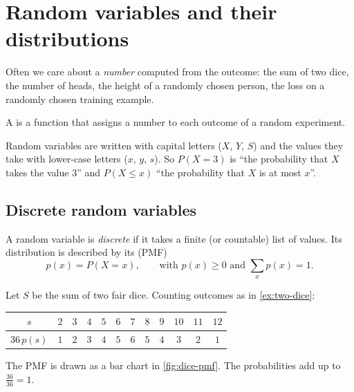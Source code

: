 \section{Random variables and their distributions}\label{sec:random-variables}

Often we care about a \emph{number} computed from the outcome: the sum of two
dice, the number of heads, the height of a randomly chosen person, the loss on a
randomly chosen training example.

\begin{definition}\label{def:random-variable}
A  is a function that assigns a number to each outcome of
a random experiment.
\end{definition}

\begin{notation}
Random variables are written with capital letters ($X$, $Y$, $S$) and the values
they take with lower-case letters ($x$, $y$, $s$). So $P(X = 3)$ is ``the
probability that $X$ takes the value $3$'' and $P(X \le x)$ ``the probability that
$X$ is at most $x$''.
\end{notation}

\subsection{Discrete random variables}

A random variable is \emph{discrete} if it takes a finite (or countable) list of
values. Its distribution is described by its 
(PMF)
\[
  p(x) = P(X = x), \qquad\text{with } p(x) \ge 0 \text{ and } \sum_x p(x) = 1 .
\]

\begin{example}\label{ex:dice-pmf}
Let $S$ be the sum of two fair dice. Counting outcomes as in \cref{ex:two-dice}:
\begin{center}
\begin{tabular}{c|ccccccccccc}
$s$ & $2$ & $3$ & $4$ & $5$ & $6$ & $7$ & $8$ & $9$ & $10$ & $11$ & $12$\\
\hline
$36\,p(s)$ & $1$ & $2$ & $3$ & $4$ & $5$ & $6$ & $5$ & $4$ & $3$ & $2$ & $1$
\end{tabular}
\end{center}
The PMF is drawn as a bar chart in \cref{fig:dice-pmf}. The probabilities add up
to $\frac{36}{36} = 1$.
\end{example}

